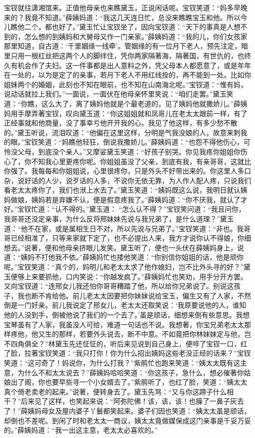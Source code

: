 \begin{parag}
    宝钗就往潇湘馆来。正值他母亲也来瞧黛玉，正说闲话呢。宝钗笑道：“妈多早晚来的？我竟不知道。”薛姨妈道：“我这几天连日忙，总没来瞧瞧宝玉和他。所以今儿瞧他二个，都也好了。”黛玉忙让宝钗坐了，因向宝钗道：“天下的事真是人想不到的，怎么想的到姨妈和大舅母又作一门亲家。”薛姨妈道：“我的儿，你们女孩家那里知道，自古道：‘千里姻缘一线牵’。管姻缘的有一位月下老人，预先注定，暗里只用一根红丝把这两个人的脚绊住，凭你两家隔著海，隔著国，有世仇的，也终久有机会作了夫妇。这一件事都是出人意料之外，凭父母本人都愿意了，或是年年在一处的，以为是定了的亲事，若月下老人不用红线拴的，再不能到一处。比如你姐妹两个的婚姻，此刻也不知在眼前，也不知在山南海北呢。”宝钗道：“惟有妈，说动话就拉上我们。”一面说，一面伏在他母亲怀里笑说：“咱们走罢。”黛玉笑道：“你瞧，这么大了，离了姨妈他就是个最老道的，见了姨妈他就撒娇儿。”薛姨妈用手摩弄著宝钗，叹向黛玉道：“你这姐姐就和凤哥儿在老太太跟前一样，有了正经事就和他商量，没了事幸亏他开开我的心。我见了他这样，有多少愁不散的。”黛玉听说，流泪叹道：“他偏在这里这样，分明是气我没娘的人，故意来刺我的眼。”宝钗笑道：“妈瞧他轻狂，倒说我撒娇儿。”薛姨妈道：“也怨不得他伤心，可怜没父母，到底没个亲人。”又摩娑黛玉笑道：“好孩子别哭。你见我疼你姐姐你伤心了，你不知我心里更疼你呢。你姐姐虽没了父亲，到底有我，有亲哥哥，这就比你强了。我每每和你姐姐说，心里很疼你，只是外头不好带出来的。你这里人多口杂，说好话的人少，说歹话的人多，不说你无依无靠，为人作人配人疼，只说我们看老太太疼你了，我们也洑上水去了。”黛玉笑道：“姨妈既这么说，我明日就认姨妈做娘，姨妈若是弃嫌不认，便是假意疼我了。”薛姨妈道：“你不厌我，就认了才好。”宝钗忙道：“认不得的。”黛玉道： “怎么认不得？”宝钗笑问道：“我且问你，我哥哥还没定亲事，为什么反将邢妹妹先说与我兄弟了，是什么道理？”黛玉道：“他不在家，或是属相生日不对，所以先说与兄弟了。”宝钗笑道：“非也。我哥哥已经相准了，只等来家就下定了，也不必提出人来，我方才说你认不得娘，你细想去。”说著，便和他母亲挤眼儿发笑。黛玉听了，便也一头伏在薛姨妈身上，说道：“姨妈不打他我不依。”薛姨妈忙也搂他笑道：“你别信你姐姐的话，他是顽你呢。”宝钗笑道：“真个的，妈明儿和老太太求了他作媳妇，岂不比外头寻的好？”黛玉便够上来要抓他，口内笑说：“你越发疯了。”薛姨妈忙也笑劝，用手分开方罢。又向宝钗道：“连邢女儿我还怕你哥哥糟踏了他，所以给你兄弟说了。别说这孩子，我也断不肯给他。前儿老太太因要把你妹妹说给宝玉，偏生又有了人家，不然倒是一门好亲。前儿我说定了邢女儿，老太太还取笑说：‘我原要说他的人，谁知他的人没到手，倒被他说了我们的一个去了。’虽是顽话，细想来倒有些意思。我想宝琴虽有了人家，我虽没人可给，难道一句话也不说。我想著，你宝兄弟老太太那样疼他，他又生的那样，若要外头说去，断不中意。不如竟把你林妹妹定与他，岂不四角俱全？”林黛玉先还怔怔的，听后来见说到自己身上，便啐了宝钗一口，红了脸，拉著宝钗笑道：“我只打你！你为什么招出姨妈这些老没正经的话来？”宝钗笑道：“这可奇了！妈说你，为什么打我？”紫鹃忙也跑来笑道：“姨太太既有这主意，为什么不和太太说去？”薛姨妈哈哈笑道：“你这孩子，急什么，想必催著你姑娘出了阁，你也要早些寻一个小女婿去了。”紫鹃听了，也红了脸，笑道：“姨太太真个倚老卖老的起来。”说著，便转身去了。黛玉先骂：“又与你这蹄子什么相干？”后来见了这样，也笑起来说：“阿弥陀佛！该，该，该！也臊了一鼻子灰去了！”薛姨妈母女及屋内婆子丫鬟都笑起来。婆子们因也笑道：“姨太太虽是顽话，却倒也不差呢。到闲了时和老太太一商议，姨太太竟做媒保成这门亲事是千妥万妥的。”薛姨妈道：“我一出这主意，老太太必喜欢的。”
\end{parag}


